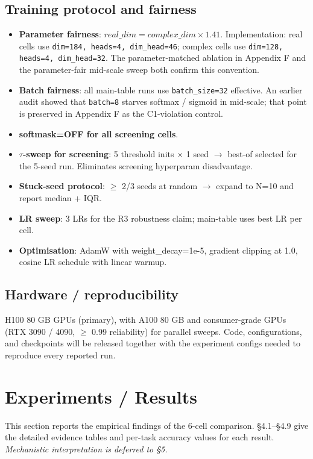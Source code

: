 \documentclass[11pt,a4paper]{article}
\theoremstyle{plain}
\theoremstyle{definition}
\begin{document}
\subsection{Training protocol and fairness}
\begin{itemize}
  \item \textbf{Parameter fairness}: $real\_dim = complex\_dim \times 1.41$. Implementation: real cells use \texttt{dim=184, heads=4, dim\_head=46}; complex cells use \texttt{dim=128, heads=4, dim\_head=32}. The parameter-matched ablation in Appendix F and the parameter-fair mid-scale sweep both confirm this convention.
  \item \textbf{Batch fairness}: all main-table runs use \texttt{batch\_size=32} effective. An earlier audit showed that \texttt{batch=8} starves softmax / sigmoid in mid-scale; that point is preserved in Appendix F as the C1-violation control.
  \item \textbf{softmask=OFF for all screening cells}.
  \item \textbf{$\tau$-sweep for screening}: 5 threshold inits $\times$ 1 seed $\to$ best-of selected for the 5-seed run. Eliminates screening hyperparam disadvantage.
  \item \textbf{Stuck-seed protocol}: $\geq$ 2/3 seeds at random $\to$ expand to N=10 and report median + IQR.
  \item \textbf{LR sweep}: 3 LRs for the R3 robustness claim; main-table uses best LR per cell.
  \item \textbf{Optimisation}: AdamW with weight\_decay=1e-5, gradient clipping at 1.0, cosine LR schedule with linear warmup.
\end{itemize}

\subsection{Hardware / reproducibility}
H100 80 GB GPUs (primary), with A100 80 GB and consumer-grade GPUs (RTX 3090 / 4090, $\geq$ 0.99 reliability) for parallel sweeps. Code, configurations, and checkpoints will be released together with the experiment configs needed to reproduce every reported run.

\medskip

\section{Experiments / Results}
This section reports the empirical findings of the 6-cell comparison. \S{}4.1--\S{}4.9 give the detailed evidence tables and per-task accuracy values for each result. \emph{Mechanistic interpretation is deferred to \S{}5.}
\end{document}
